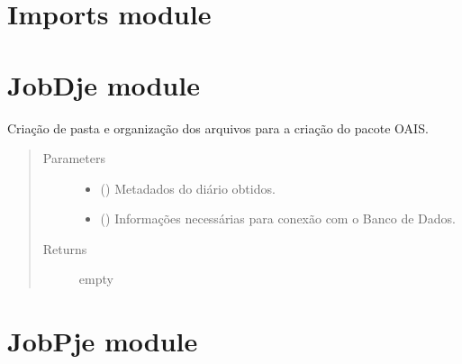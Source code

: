 \documentclass[letterpaper,10pt,english]{sphinxmanual}
\begin{document}
\section{Imports module}
\label{\detokenize{Imports:module-Imports}}\label{\detokenize{Imports:imports-module}}\label{\detokenize{Imports::doc}}

\section{JobDje module}
\label{\detokenize{JobDje:module-JobDje}}\label{\detokenize{JobDje:jobdje-module}}\label{\detokenize{JobDje::doc}}

\begin{fulllineitems}
\label{\detokenize{JobDje:JobDje.job}}
Criação de pasta e organização dos arquivos para a criação do pacote OAIS.
\begin{quote}\begin{description}
\item[{Parameters}] \leavevmode\begin{itemize}
\item {} 
 () \textendash{} Metadados do diário obtidos.

\item {} 
 () \textendash{} Informações necessárias para conexão com o Banco de Dados.

\end{itemize}

\item[{Returns}] \leavevmode
empty

\end{description}\end{quote}

\end{fulllineitems}



\section{JobPje module}
\label{\detokenize{JobPje:module-JobPje}}\label{\detokenize{JobPje:jobpje-module}}\label{\detokenize{JobPje::doc}}
\end{document}
